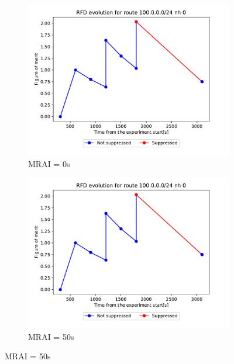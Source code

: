 \begin{figure}[h]
     \centering
     \begin{subfigure}[b]{0.3\textwidth}
         \centering
         \includegraphics[width=\textwidth]{images/RFD/clique/FigureOfMerit/mrai1_RFD_5_rfd_R1.pdf}
         \caption{MRAI = 0s}
         \label{fig:clique_5_mrai0}
     \end{subfigure}
     \hfill
     \begin{subfigure}[b]{0.3\textwidth}
         \centering
         \includegraphics[width=\textwidth]{images/RFD/clique/FigureOfMerit/mrai11_RFD_5_rfd_R1.pdf}
         \caption{MRAI = 50s}
         \label{fig:clique_5_mrai50}
     \end{subfigure}

\end{figure}
